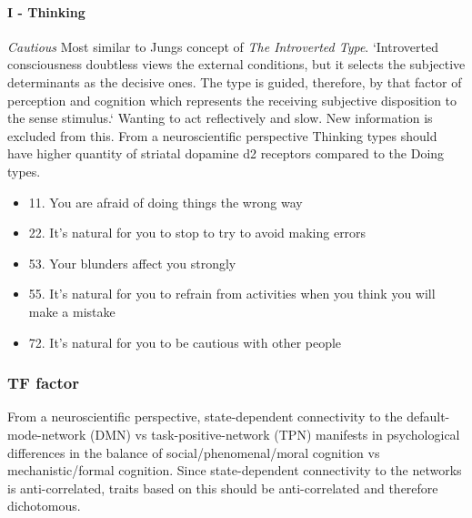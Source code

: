\documentclass[11pt,a4paper]{article}
\begin{document}
\paragraph{I - Thinking}
\emph{Cautious}
Most similar to Jungs concept of \emph{The Introverted Type}.
`Introverted consciousness doubtless views the external conditions, but it selects the subjective determinants as the decisive ones. The type is guided, therefore, by that factor of perception and cognition which represents the receiving subjective disposition to the sense stimulus.`\cite[p. 472]{jung1}
Wanting to act reflectively and slow. New information is excluded from this.
From a neuroscientific perspective Thinking types should have higher quantity of striatal dopamine d2 receptors compared to the Doing types.
\begin{itemize}
  \item 11. You are afraid of doing things the wrong way
  \item 22. It's natural for you to stop to try to avoid making errors
  \item 53. Your blunders affect you strongly
  \item 55. It's natural for you to refrain from activities when you think you will make a mistake
  \item 72. It's natural for you to be cautious with other people
\end{itemize}

\subsubsection{TF factor}
From a neuroscientific perspective, state-dependent connectivity to the default-mode-network (DMN) vs task-positive-network (TPN) manifests in psychological differences in the balance of social/phenomenal/moral cognition vs mechanistic/formal cognition.
Since state-dependent connectivity to the networks is anti-correlated, traits based on this should be anti-correlated and therefore dichotomous. \cite{tf1,tf2,tf3,tf4,tf5,tf6,tf7,tf8,tf9,tf10,tf11,tf12,tf13,tf14,tf15,tf16}
\end{document}
